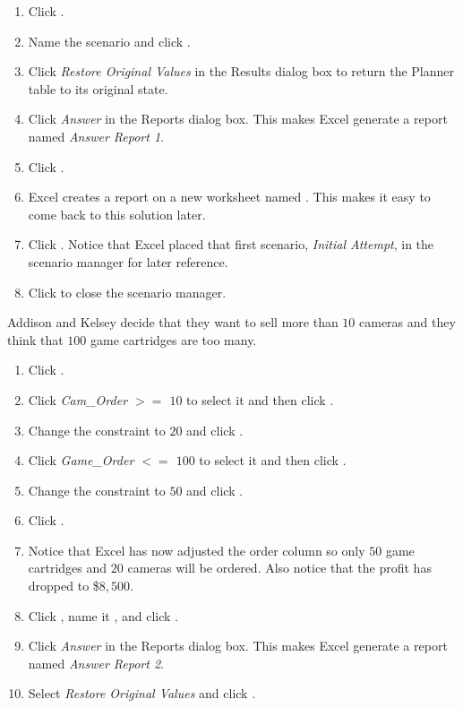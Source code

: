 \begin{enumerate}[resume]
	\item Click .
	\item Name the scenario  and click .
	\item Click \textit{Restore Original Values} in the Results dialog box to return the Planner table to its original state.
	\item Click \textit{Answer} in the Reports dialog box. This makes Excel generate a report named \textit{Answer Report 1}.
	\item Click .
	\item Excel creates a report on a new worksheet named . This makes it easy to come back to this solution later.
	\item Click .	Notice that Excel placed that first scenario, \textit{Initial Attempt}, in the scenario manager for later reference.
	\item Click  to close the scenario manager.
\end{enumerate}

Addison and Kelsey decide that they want to sell more than $ 10 $ cameras and they think that $ 100 $ game cartridges are too many. 

\begin{enumerate}
	\item Click .
	\item Click \textit{Cam\_Order $ >=$ $ 10 $} to select it and then click .
	\item Change the constraint to $ 20 $ and click .
	\item Click \textit{Game\_Order $ <=$ $ 100 $} to select it and then click .
	\item Change the constraint to $ 50 $ and click .
	\item Click .
	\item Notice that Excel has now adjusted the order column so only $ 50 $ game cartridges and $ 20 $ cameras will be ordered. Also notice that the profit has dropped to \$$ 8,500 $. 
	\item Click , name it , and click .
	\item Click \textit{Answer} in the Reports dialog box. This makes Excel generate a report named \textit{Answer Report 2}.
	\item Select \textit{Restore Original Values} and click .
\end{enumerate}

